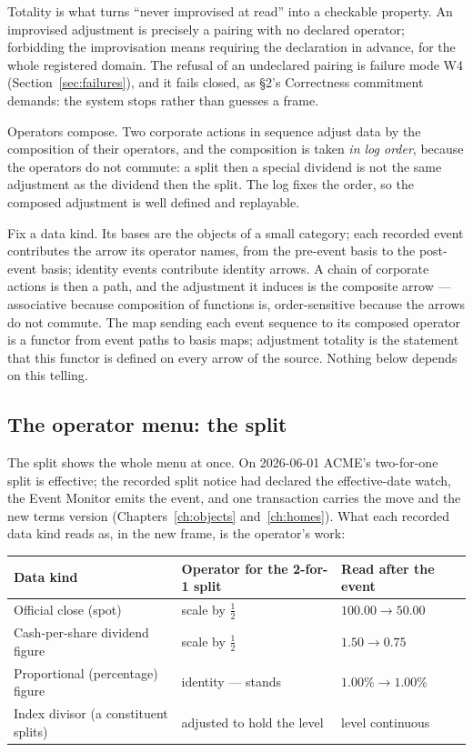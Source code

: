 Totality is what turns ``never improvised at read'' into a checkable property. An
improvised adjustment is precisely a pairing with no declared operator; forbidding the
improvisation means requiring the declaration in advance, for the whole registered domain.
The refusal of an undeclared pairing is failure mode W4 (Section~\ref{sec:failures}), and
it fails closed, as \S 2's Correctness commitment demands: the system stops rather than
guesses a frame.

Operators compose. Two corporate actions in sequence adjust data by the composition of
their operators, and the composition is taken \emph{in log order}, because the operators do
not commute: a split then a special dividend is not the same adjustment as the dividend
then the split. The log fixes the order, so the composed adjustment is well defined and
replayable.

\begin{secondtelling}
Fix a data kind. Its bases are the objects of a small category; each recorded event
contributes the arrow its operator names, from the pre-event basis to the post-event basis;
identity events contribute identity arrows. A chain of corporate actions is then a path, and
the adjustment it induces is the composite arrow --- associative because composition of
functions is, order-sensitive because the arrows do not commute. The map sending each event
sequence to its composed operator is a functor from event paths to basis maps; adjustment
totality is the statement that this functor is defined on every arrow of the source. Nothing
below depends on this telling.
\end{secondtelling}

\subsection{The operator menu: the split}\label{sec:menu}

The split shows the whole menu at once. On 2026-06-01 ACME's two-for-one split is
effective; the recorded split notice had declared the effective-date watch, the Event
Monitor emits the event, and one transaction carries the move and the new terms version
(Chapters~\ref{ch:objects} and~\ref{ch:homes}). What each recorded data kind reads as, in
the new frame, is the operator's work:

\begin{center}
\begin{tabular}{@{}lll@{}}
\toprule
Data kind & Operator for the 2-for-1 split & Read after the event \\
\midrule
Official close (spot) & scale by $\tfrac12$ & $100.00 \rightarrow 50.00$ \\
Cash-per-share dividend figure & scale by $\tfrac12$ & $1.50 \rightarrow 0.75$ \\
Proportional (percentage) figure & identity --- stands & $1.00\% \rightarrow 1.00\%$ \\
Index divisor (a constituent splits) & adjusted to hold the level & level continuous \\
\bottomrule
\end{tabular}
\end{center}

